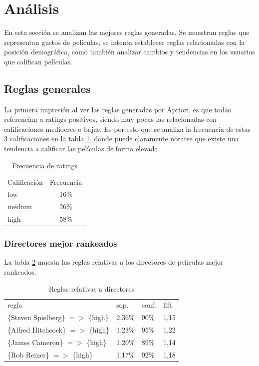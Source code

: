 \documentclass[journal]{IEEEtran}
\begin{document}
\section{Análisis}
En esta sección se analizan las mejores reglas generadas. 
Se muestran reglas que representan gustos
de películas, se intenta establecer reglas relacionadas con la
posición demográfica, como también analizar cambios y tendencias 
en los usuarios que califican películas.

\subsection{Reglas generales}
La primera impresión al ver las reglas generadas por Apriori, es que todas 
referencian a ratings positivos, siendo muy pocas las relacionadas con 
calificaciones mediocres o bajas. Es por esto que se analiza la frecuencia
de estas 3 calificaciones en la tabla \ref{rating_freq}, donde puede
claramente notarse que existe una tendencia a calificar las 
películas de forma elevada.

\begin{table}[ht!]
\caption{Frecuencia de ratings}
\label{rating_freq}
\centering
\begin{tabular}{l c}
Calificación & Frecuencia \\
low &  16\% \\
medium & 26\% \\
high & 58\%
\end{tabular}
\end{table}

\subsubsection{Directores mejor rankeados}
La tabla \ref{table_best_directors} muesta las reglas relativas a los 
directores de películas mejor rankeados.
\begin{table}[ht!]
\caption{Reglas relativas a directores}
\label{table_best_directors}
\centering
\begin{tabular}{l l l l }
regla & sop. & conf. & lift \\
\{Steven Spielberg\} $=$$>$ \{high\} & 2,36\% & 90\% & 1,15 \\
\{Alfred Hitchcock\} $=$$>$ \{high\} & 1,23\% & 95\% & 1,22 \\
\{James Cameron\} $=$$>$ \{high\} & 1,20\% & 89\% & 1,14 \\
\{Rob Reiner\} $=$$>$ \{high\} & 1,17\% & 92\% & 1,18
\end{tabular}
\end{table}
\end{document}
